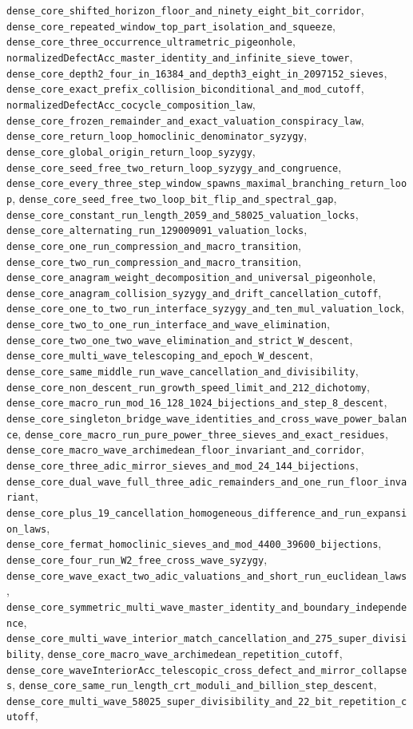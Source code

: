 \documentclass[11pt]{article}
\begin{document}
\begin{enumerate}
\texttt{dense\_core\_shifted\_horizon\_floor\_and\_ninety\_eight\_bit\_corridor}, \texttt{dense\_core\_repeated\_window\_top\_part\_isolation\_and\_squeeze}, \texttt{dense\_core\_three\_occurrence\_ultrametric\_pigeonhole}, \texttt{normalizedDefectAcc\_master\_identity\_and\_infinite\_sieve\_tower}, \texttt{dense\_core\_depth2\_four\_in\_16384\_and\_depth3\_eight\_in\_2097152\_sieves}, \texttt{dense\_core\_exact\_prefix\_collision\_biconditional\_and\_mod\_cutoff}, \texttt{normalizedDefectAcc\_cocycle\_composition\_law}, \texttt{dense\_core\_frozen\_remainder\_and\_exact\_valuation\_conspiracy\_law}, \texttt{dense\_core\_return\_loop\_homoclinic\_denominator\_syzygy}, \texttt{dense\_core\_global\_origin\_return\_loop\_syzygy}, \texttt{dense\_core\_seed\_free\_two\_return\_loop\_syzygy\_and\_congruence}, \texttt{dense\_core\_every\_three\_step\_window\_spawns\_maximal\_branching\_return\_loop}, \texttt{dense\_core\_seed\_free\_two\_loop\_bit\_flip\_and\_spectral\_gap}, \texttt{dense\_core\_constant\_run\_length\_2059\_and\_58025\_valuation\_locks}, \texttt{dense\_core\_alternating\_run\_129009091\_valuation\_locks}, \texttt{dense\_core\_one\_run\_compression\_and\_macro\_transition}, \texttt{dense\_core\_two\_run\_compression\_and\_macro\_transition}, \texttt{dense\_core\_anagram\_weight\_decomposition\_and\_universal\_pigeonhole}, \texttt{dense\_core\_anagram\_collision\_syzygy\_and\_drift\_cancellation\_cutoff}, \texttt{dense\_core\_one\_to\_two\_run\_interface\_syzygy\_and\_ten\_mul\_valuation\_lock}, \texttt{dense\_core\_two\_to\_one\_run\_interface\_and\_wave\_elimination}, \texttt{dense\_core\_two\_one\_two\_wave\_elimination\_and\_strict\_W\_descent}, \texttt{dense\_core\_multi\_wave\_telescoping\_and\_epoch\_W\_descent}, \texttt{dense\_core\_same\_middle\_run\_wave\_cancellation\_and\_divisibility}, \texttt{dense\_core\_non\_descent\_run\_growth\_speed\_limit\_and\_212\_dichotomy}, \texttt{dense\_core\_macro\_run\_mod\_16\_128\_1024\_bijections\_and\_step\_8\_descent}, \texttt{dense\_core\_singleton\_bridge\_wave\_identities\_and\_cross\_wave\_power\_balance}, \texttt{dense\_core\_macro\_run\_pure\_power\_three\_sieves\_and\_exact\_residues}, \texttt{dense\_core\_macro\_wave\_archimedean\_floor\_invariant\_and\_corridor}, \texttt{dense\_core\_three\_adic\_mirror\_sieves\_and\_mod\_24\_144\_bijections}, \texttt{dense\_core\_dual\_wave\_full\_three\_adic\_remainders\_and\_one\_run\_floor\_invariant}, \texttt{dense\_core\_plus\_19\_cancellation\_homogeneous\_difference\_and\_run\_expansion\_laws}, \texttt{dense\_core\_fermat\_homoclinic\_sieves\_and\_mod\_4400\_39600\_bijections}, \texttt{dense\_core\_four\_run\_W2\_free\_cross\_wave\_syzygy}, \texttt{dense\_core\_wave\_exact\_two\_adic\_valuations\_and\_short\_run\_euclidean\_laws}, \texttt{dense\_core\_symmetric\_multi\_wave\_master\_identity\_and\_boundary\_independence}, \texttt{dense\_core\_multi\_wave\_interior\_match\_cancellation\_and\_275\_super\_divisibility}, \texttt{dense\_core\_macro\_wave\_archimedean\_repetition\_cutoff}, \texttt{dense\_core\_waveInteriorAcc\_telescopic\_cross\_defect\_and\_mirror\_collapses}, \texttt{dense\_core\_same\_run\_length\_crt\_moduli\_and\_billion\_step\_descent}, \texttt{dense\_core\_multi\_wave\_58025\_super\_divisibility\_and\_22\_bit\_repetition\_cutoff}, 
\end{enumerate}
\end{document}
